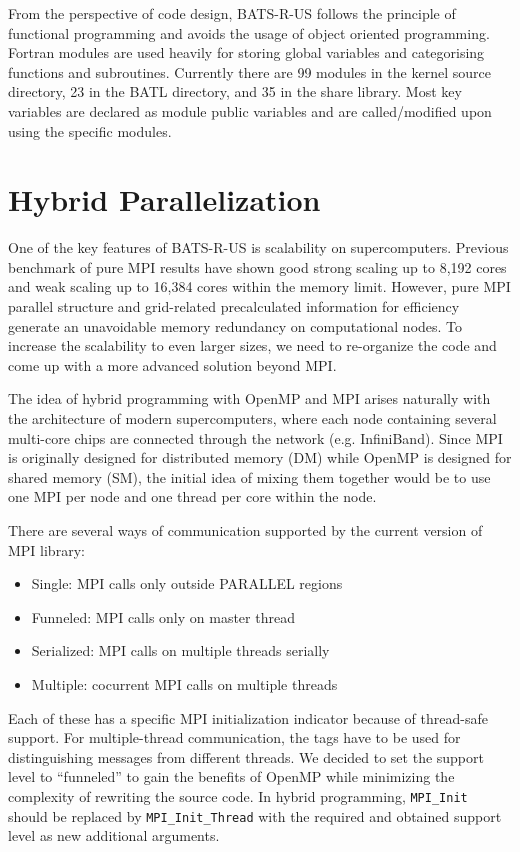 \documentclass[fleqn,11pt]{SelfArx} %
\begin{document}
From the perspective of code design, BATS-R-US follows the principle of functional programming and avoids the usage of object oriented programming. Fortran modules are used heavily for storing global variables and categorising functions and subroutines. Currently there are 99 modules in the kernel source directory, 23 in the BATL directory, and 35 in the share library. Most key variables are declared as module public variables and are called/modified upon using the specific modules.


\section{Hybrid Parallelization}

One of the key features of BATS-R-US is scalability on supercomputers. Previous benchmark of pure MPI results have shown good strong scaling up to 8,192 cores and weak scaling up to 16,384 cores within the memory limit. However, pure MPI parallel structure and grid-related precalculated information for efficiency generate an unavoidable memory redundancy on computational nodes. To increase the scalability to even larger sizes, we need to re-organize the code and come up with a more advanced solution beyond MPI.

The idea of hybrid programming with OpenMP and MPI arises naturally with the architecture of modern supercomputers, where each node containing several multi-core chips are connected through the network (e.g. InfiniBand). Since MPI is originally designed for distributed memory (DM) while OpenMP is designed for shared memory (SM), the initial idea of mixing them together would be to use one MPI per node and one thread per core within the node. 

There are several ways of communication supported by the current version of MPI library:
\begin{itemize}[noitemsep]
\item Single: MPI calls only outside PARALLEL regions
\item Funneled: MPI calls only on master thread
\item Serialized: MPI calls on multiple threads serially
\item Multiple: cocurrent MPI calls on multiple threads
\end{itemize}

Each of these has a specific MPI initialization indicator because of thread-safe support. For multiple-thread communication, the tags have to be used for distinguishing messages from different threads. We decided to set the support level to ``funneled'' to gain the benefits of OpenMP while minimizing the complexity of rewriting the source code. In hybrid programming, \verb|MPI_Init| should be replaced by \verb|MPI_Init_Thread| with the required and obtained support level as new additional arguments.
\end{document}
